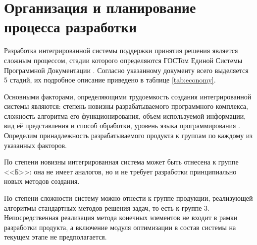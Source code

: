 \documentclass[14pt,oneside,final]{extreport}
\begin{document}
	\section{Организация и планирование процесса разработки}
	Разработка интегрированной системы поддержки принятия решения является сложным процессом, стадии которого определяются ГОСТом Единой Системы Программной Документации \cite{gost:19102}. Согласно указанному документу всего выделяется 5 стадий, их подробное описание приведено в таблице \ref{tab:economy}.
	
	Основными факторами, определяющими трудоемкость создания интегрированной системы являются: степень новизны разрабатываемого программного комплекса, сложность алгоритма его функционирования, объем используемой информации, вид её представления и способ обработки, уровень языка программирования \cite{metoda:Economy}. Определим принадлежность разрабатываемого продукта к группам по каждому из указанных факторов. 
	
	По степени новизны интегрированная система может быть отнесена к группе <<Б>>: она не имеет аналогов, но и не требует разработки принципиально новых методов создания. 
	
	По степени сложности систему можно отнести к группе продукции, реализующей алгоритмы стандартных методов 
	решения задач, то есть к группе 3. Непосредственная реализация метода конечных элементов не входит в рамки разработки продукта, а включение модуля оптимизации в состав системы  на текущем этапе не предполагается.  \newpage
\end{document}
